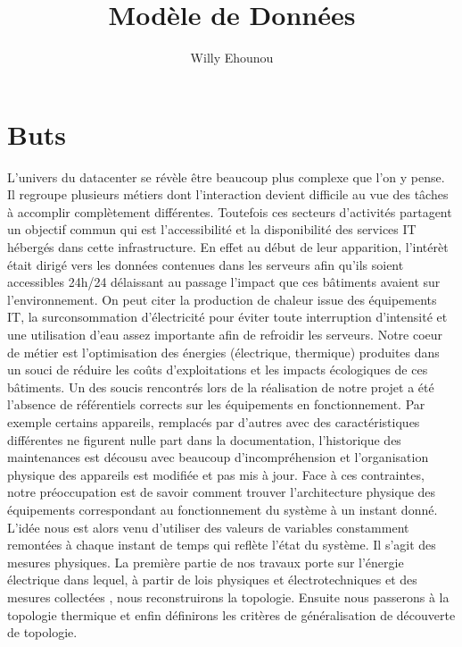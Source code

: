 \documentclass[onecolumn, 12pt]{article}
\title{Mod\`ele de Donn\'ees}
\author{Willy Ehounou}
\begin{document}
\maketitle
\tableofcontents
\listoffigures
\section{Buts}
L'univers du datacenter se r\'ev\`ele \^etre beaucoup plus complexe que l'on y pense. Il regroupe plusieurs m\'etiers dont l'interaction devient difficile au vue des t\^aches \`a accomplir compl\`etement diff\'erentes. Toutefois ces secteurs d'activit\'es partagent un objectif commun qui est l'accessibilit\'e et la disponibilit\'e des services IT h\'eberg\'es dans cette infrastructure. En effet au d\'ebut de leur apparition, l'int\'er\`et \'etait dirig\'e vers les donn\'ees contenues dans les serveurs afin qu'ils soient accessibles 24h/24 d\'elaissant au passage l'impact que ces b\^atiments avaient sur l'environnement. On peut citer la production de chaleur issue des \'equipements IT, la surconsommation d'\'electricit\'e pour \'eviter toute interruption d'intensit\'e et une utilisation d'eau assez importante afin de refroidir les serveurs.\newline
Notre coeur de m\'etier est l'optimisation des \'energies (\'electrique, thermique) produites dans un souci de r\'eduire les co\^uts d'exploitations et les impacts \'ecologiques de ces b\^atiments. Un des soucis rencontr\'es lors de la r\'ealisation de notre projet a \'et\'e l'absence de r\'ef\'erentiels corrects sur les \'equipements en fonctionnement. Par exemple certains appareils, remplac\'es par d'autres avec des caract\'eristiques diff\'erentes ne figurent nulle part dans la documentation, l'historique des maintenances est d\'ecousu avec beaucoup d'incompr\'ehension et l'organisation physique des appareils est modifi\'ee et pas mis \`a jour.\newline
 Face \`a ces contraintes, notre pr\'eoccupation est de savoir comment trouver l'architecture physique des \'equipements correspondant au fonctionnement du syst\`eme \`a un instant donn\'e. L'id\'ee nous est alors venu d'utiliser des valeurs de variables constamment remont\'ees \`a chaque instant de temps qui refl\`ete l'\'etat du syst\`eme. Il s'agit des mesures physiques. 
La premi\`ere partie de nos travaux porte sur l'\'energie \'electrique dans lequel, \`a partir de lois physiques et \'electrotechniques et des mesures collect\'ees , nous reconstruirons la topologie. Ensuite nous passerons \`a la topologie thermique et enfin d\'efinirons les crit\`eres  de g\'en\'eralisation de d\'ecouverte de topologie.   
\end{document}
